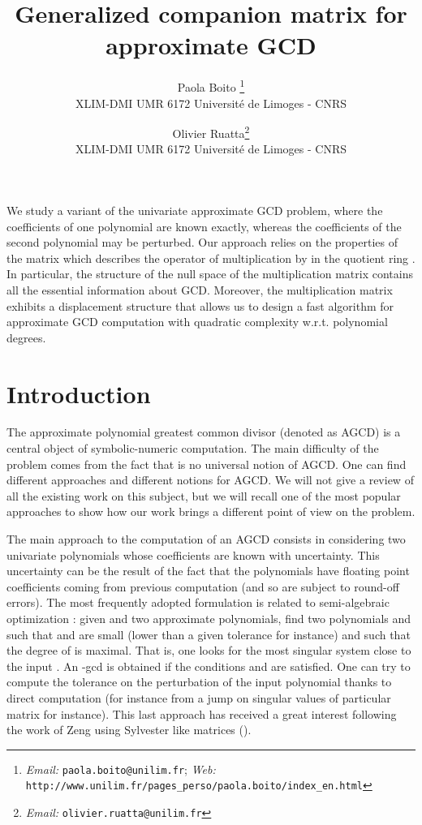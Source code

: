 \documentclass{article}
\newcommand{\email}[1]{{\textit{Email:} \texttt{#1}}}
\newcommand{\homepage}[1]{{\textit{Web:} \texttt{#1}}}
\begin{document}
\title{Generalized companion matrix for approximate GCD}\author{Paola
Boito \thanks{\email{paola.boito@unilim.fr};
\homepage{http://www.unilim.fr/pages\_perso/paola.boito/index\_en.html}}\\
XLIM-DMI UMR 6172 Universit\'e de Limoges - CNRS \\  \and Olivier
Ruatta\thanks{\email{olivier.ruatta@unilim.fr}}\\
XLIM-DMI UMR 6172 Universit\'e de Limoges - CNRS}\maketitle



{\small{We study a variant of the univariate approximate GCD problem, where
the coefficients of one polynomial are known exactly, whereas the
coefficients of the second polynomial may be perturbed. Our approach
relies on the properties of the matrix which describes the operator of
multiplication by in the quotient ring . In
particular, the structure of the null space of the multiplication matrix
contains all the essential information about GCD. Moreover, the
multiplication matrix exhibits a displacement structure that allows us to
design a fast algorithm for approximate GCD computation with quadratic
complexity w.r.t. polynomial degrees.}}

\section{Introduction\label{intro}}


The approximate polynomial greatest common divisor (denoted as AGCD) is a
central object of symbolic-numeric computation. The main difficulty of the
problem comes from the fact that is no universal notion of AGCD. One can find
different approaches and different notions for AGCD. We will not give a review
of all the existing work on this subject, but we will recall one of the most
popular approaches to show how our work brings a different point of view on
the problem.

The main approach to the computation of an AGCD consists in considering two
univariate polynomials whose coefficients are known with uncertainty. This
uncertainty can be the result of the fact that the polynomials have floating
point coefficients coming from previous computation (and so are subject to
round-off errors). The most frequently adopted formulation is related to
semi-algebraic optimization : given  and  two
approximate polynomials, find two polynomials  and  such that  and  are small (lower than a given
tolerance for instance) and such that the degree of  is maximal.
That is, one looks for the most singular system close to the input . An -gcd is obtained if the conditions  and  are
satisfied. One can try to compute the tolerance on the perturbation of the
input polynomial thanks to direct computation (for instance from a jump on
singular values of particular matrix for instance). This last approach has
received a great interest following the work of Zeng using Sylvester like
matrices ({\cite{Zeng}}). \
\end{document}
